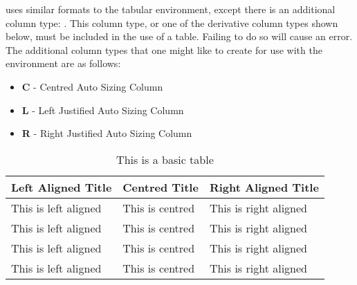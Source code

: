    uses similar formats to the tabular environment, except there is an additional column type: .
  This column type, or one of the derivative column types shown below, must be included in the use of a table. 
  Failing to do so will cause an error. The additional column types that one might like to create for use with the  environment are as follows:
  \begin{itemize}
    \item \textbf{C} - Centred Auto Sizing Column\\
    \item \textbf{L} - Left Justified Auto Sizing Column \\
    \item \textbf{R} - Right Justified Auto Sizing Column \\
  \end{itemize}
  
  \begin{table}[H]
    \caption{This is a basic table}
    \centering
    \begin{tabularx}{0.75\textwidth}{LCR} 
      \toprule
        \textbf{Left Aligned Title} & \textbf{Centred Title} & \textbf{Right Aligned Title} \\
      \midrule
        This is left aligned & This is centred & This is right aligned\\
        This is left aligned & This is centred & This is right aligned\\
        This is left aligned & This is centred & This is right aligned\\
        This is left aligned & This is centred & This is right aligned\\
      \bottomrule
    \end{tabularx}
    \label{tab:basicTable}
  \end{table}
  
